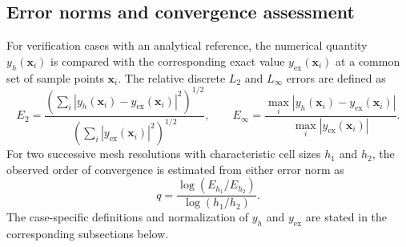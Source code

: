 \documentclass[final,num,12pt]{elsarticle}
\newcommand{\x}{\mathbf{x}}
\begin{document}
\subsection{Error norms and convergence assessment}
For verification cases with an analytical reference, the numerical quantity
$y_h(\x_i)$ is compared with the corresponding exact value
$y_{\mathrm{ex}}(\x_i)$ at a common set of sample points $\x_i$.  The relative
discrete $L_2$ and $L_\infty$ errors are defined as
\begin{equation}
    E_2 =
    \frac{
    \left(\sum_i |y_h(\x_i)-y_{\mathrm{ex}}(\x_i)|^2\right)^{1/2}
    }{
    \left(\sum_i |y_{\mathrm{ex}}(\x_i)|^2\right)^{1/2}
    },
    \qquad
    E_\infty =
    \frac{
    \max_i |y_h(\x_i)-y_{\mathrm{ex}}(\x_i)|
    }{
    \max_i |y_{\mathrm{ex}}(\x_i)|
    }.
    \label{eq:verificationErrorNorms}
\end{equation}
For two successive mesh resolutions with characteristic cell sizes $h_1$ and
$h_2$, the observed order of convergence is estimated from either error norm
as
\begin{equation}
    q=\frac{\log(E_{h_1}/E_{h_2})}{\log(h_1/h_2)}.
    \label{eq:verificationObservedOrder}
\end{equation}
The case-specific definitions and normalization of $y_h$ and
$y_{\mathrm{ex}}$ are stated in the corresponding subsections below.
\end{document}
